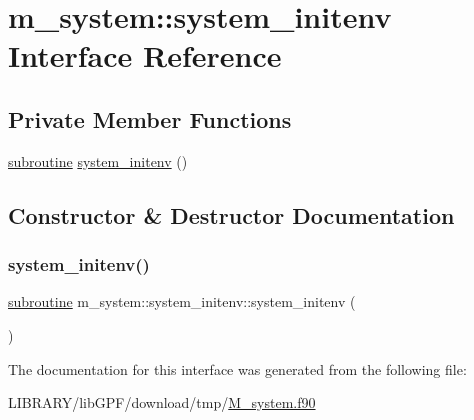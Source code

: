 \hypertarget{interfacem__system_1_1system__initenv}{}\section{m\+\_\+system\+:\+:system\+\_\+initenv Interface Reference}
\label{interfacem__system_1_1system__initenv}
\subsection*{Private Member Functions}
\begin{DoxyCompactItemize}
\item 
\hyperlink{M__stopwatch_83_8txt_acfbcff50169d691ff02d4a123ed70482}{subroutine} \hyperlink{interfacem__system_1_1system__initenv_ae9625871bb13fdbc88fbd1dc854a45d6}{system\+\_\+initenv} ()
\end{DoxyCompactItemize}


\subsection{Constructor \& Destructor Documentation}
\mbox{\label{interfacem__system_1_1system__initenv_ae9625871bb13fdbc88fbd1dc854a45d6}} 
\subsubsection{\texorpdfstring{system\+\_\+initenv()}{system\_initenv()}}
{\footnotesize\ttfamily \hyperlink{M__stopwatch_83_8txt_acfbcff50169d691ff02d4a123ed70482}{subroutine} m\+\_\+system\+::system\+\_\+initenv\+::system\+\_\+initenv (\begin{DoxyParamCaption}{ }\end{DoxyParamCaption})\hspace{0.3cm}{\ttfamily [private]}}



The documentation for this interface was generated from the following file\+:\begin{DoxyCompactItemize}
\item 
L\+I\+B\+R\+A\+R\+Y/lib\+G\+P\+F/download/tmp/\hyperlink{M__system_8f90}{M\+\_\+system.\+f90}\end{DoxyCompactItemize}
